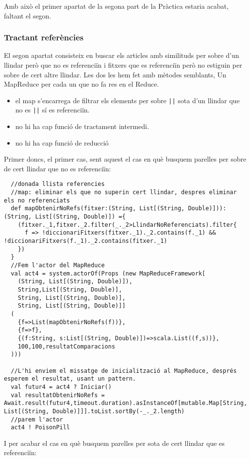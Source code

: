 \documentclass[11pt,a4paper,twoside]{report}
\begin{document}
Amb això el primer apartat de la segona part de la Pràctica estaria acabat, faltant el segon.

\subsubsection{Tractant referències}
El segon apartat consisteix en buscar els articles amb similituds per sobre d'un llindar però que no es referenciïn
i fitxers que es referenciïn però no estiguin per sobre de cert altre llindar. Les dos les hem fet amb mètodes semblants, Un MapReduce per cada un que no fa res en el Reduce.
\begin{itemize}
  \item el map s'encarrega de filtrar els elements per {sobre \texttt{||} sota} d'un llindar que {no es \texttt{||} sí es} referenciïn.
  \item no hi ha cap funció de tractament intermedi.
  \item no hi ha cap funció de reducció
\end{itemize}

Primer doncs, el primer cas, sent aquest el cas en què busquem parelles per sobre de cert llindar que no es referenciïn:
\begin{lstlisting}
  //donada llista referencies
  //map: eliminar els que no superin cert llindar, despres eliminar els no referenciats
  def mapObtenirNoRefs(fitxer:(String, List[(String, Double)])):(String, List[(String, Double)]) ={
    (fitxer._1,fitxer._2.filter(_._2>LlindarNoReferenciats).filter{
      f => !diccionariFitxers(fitxer._1)._2.contains(f._1) && !diccionariFitxers(f._1)._2.contains(fitxer._1)
    })
  }
  //Fem l'actor del MapReduce
  val act4 = system.actorOf(Props (new MapReduceFramework[
    (String, List[(String, Double)]),
    String,List[(String, Double)],
    String, List[(String, Double)],
    String, List[(String, Double)]]
  (
    {f=>List(mapObtenirNoRefs(f))},
    {f=>f},
    {(f:String, s:List[(String, Double)])=>scala.List((f,s))},
    100,100,resultatComparacions
  )))

  //L'hi enviem el missatge de inicialització al MapReduce, després esperem el resultat, usant un pattern.
  val futur4 = act4 ? Iniciar()
  val resultatObtenirNoRefs = Await.result(futur4,timeout.duration).asInstanceOf[mutable.Map[String, List[(String, Double)]]].toList.sortBy(-_._2.length)
  //parem l'actor
  act4 ! PoisonPill
\end{lstlisting}

I per acabar el cas en què busquem parelles per sota de cert llindar que es referenciïn:
\end{document}
